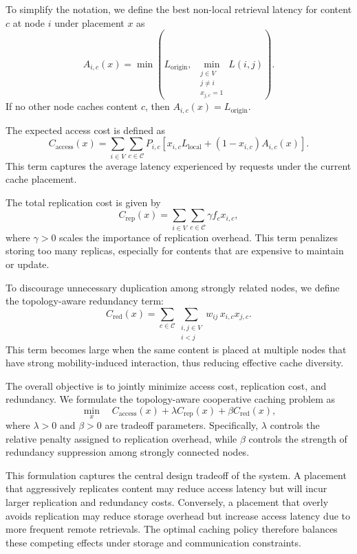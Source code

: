 To simplify the notation, we define the best non-local retrieval latency for content \(c\) at node \(i\) under placement \(x\) as
\[
A_{i,c}(x)
=
\min\!\left(
L_{\text{origin}},
\;
\min_{\substack{j \in V \\ j \neq i \\ x_{j,c}=1}} L(i,j)
\right).
\]
If no other node caches content \(c\), then \(A_{i,c}(x)=L_{\text{origin}}\).

The expected access cost is defined as
\[
C_{\text{access}}(x)
=
\sum_{i \in V}\sum_{c \in \mathcal{C}}
P_{i,c}
\left[
x_{i,c}L_{\text{local}}
+
(1-x_{i,c})A_{i,c}(x)
\right].
\]
This term captures the average latency experienced by requests under the current cache placement.

The total replication cost is given by
\[
C_{\text{rep}}(x)
=
\sum_{i \in V}\sum_{c \in \mathcal{C}}
\gamma f_c x_{i,c},
\]
where \(\gamma > 0\) scales the importance of replication overhead. This term penalizes storing too many replicas, especially for contents that are expensive to maintain or update.

To discourage unnecessary duplication among strongly related nodes, we define the topology-aware redundancy term:
\[
C_{\text{red}}(x)
=
\sum_{c \in \mathcal{C}}
\sum_{\substack{i,j \in V \\ i<j}}
w_{ij}\,x_{i,c}x_{j,c}.
\]
This term becomes large when the same content is placed at multiple nodes that have strong mobility-induced interaction, thus reducing effective cache diversity.

The overall objective is to jointly minimize access cost, replication cost, and redundancy. We formulate the topology-aware cooperative caching problem as
\[
\min_{x}
\quad
C_{\text{access}}(x)
+
\lambda C_{\text{rep}}(x)
+
\beta C_{\text{red}}(x),
\]
where \(\lambda > 0\) and \(\beta > 0\) are tradeoff parameters. Specifically, \(\lambda\) controls the relative penalty assigned to replication overhead, while \(\beta\) controls the strength of redundancy suppression among strongly connected nodes.

This formulation captures the central design tradeoff of the system. A placement that aggressively replicates content may reduce access latency but will incur larger replication and redundancy costs. Conversely, a placement that overly avoids replication may reduce storage overhead but increase access latency due to more frequent remote retrievals. The optimal caching policy therefore balances these competing effects under storage and communication constraints.

